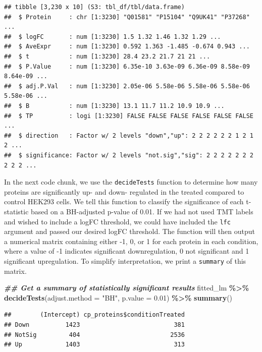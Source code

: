 \documentclass[9pt,a4paper,]{extarticle}
\newenvironment{Shaded}{\begin{snugshade}}{\end{snugshade}}
\newcommand{\AttributeTok}[1]{\textcolor[rgb]{0.13,0.29,0.53}{#1}}
\newcommand{\DocumentationTok}[1]{\textcolor[rgb]{0.56,0.35,0.01}{\textbf{\textit{#1}}}}
\newcommand{\FloatTok}[1]{\textcolor[rgb]{0.00,0.00,0.81}{#1}}
\newcommand{\FunctionTok}[1]{\textcolor[rgb]{0.13,0.29,0.53}{\textbf{#1}}}
\newcommand{\NormalTok}[1]{#1}
\newcommand{\SpecialCharTok}[1]{\textcolor[rgb]{0.81,0.36,0.00}{\textbf{#1}}}
\newcommand{\StringTok}[1]{\textcolor[rgb]{0.31,0.60,0.02}{#1}}
\begin{document}
\begin{verbatim}
## tibble [3,230 x 10] (S3: tbl_df/tbl/data.frame)
##  $ Protein     : chr [1:3230] "Q01581" "P15104" "Q9UK41" "P37268" ...
##  $ logFC       : num [1:3230] 1.5 1.32 1.46 1.32 1.29 ...
##  $ AveExpr     : num [1:3230] 0.592 1.363 -1.485 -0.674 0.943 ...
##  $ t           : num [1:3230] 28.4 23.2 21.7 21 21 ...
##  $ P.Value     : num [1:3230] 6.35e-10 3.63e-09 6.36e-09 8.58e-09 8.64e-09 ...
##  $ adj.P.Val   : num [1:3230] 2.05e-06 5.58e-06 5.58e-06 5.58e-06 5.58e-06 ...
##  $ B           : num [1:3230] 13.1 11.7 11.2 10.9 10.9 ...
##  $ TP          : logi [1:3230] FALSE FALSE FALSE FALSE FALSE FALSE ...
##  $ direction   : Factor w/ 2 levels "down","up": 2 2 2 2 2 2 1 2 1 2 ...
##  $ significance: Factor w/ 2 levels "not.sig","sig": 2 2 2 2 2 2 2 2 2 2 ...
\end{verbatim}

In the next code chunk, we use the \texttt{decideTests} function to determine how many
proteins are significantly up- and down- regulated in the treated compared to control
HEK293 cells. We tell this function to classify the significance of each
t-statistic based on a BH-adjusted p-value of 0.01. If we had not used TMT
labels and wished to include a logFC threshold, we could have included the \texttt{lfc} argument
and passed our desired logFC threshold. The function will then output a numerical
matrix containing either -1, 0, or 1 for each protein in each condition, where a
value of -1 indicates significant downregulation, 0 not significant and 1 significant
upregulation. To simplify interpretation, we print a \texttt{summary} of this matrix.

\begin{Shaded}
\begin{Highlighting}[]
\DocumentationTok{\#\# Get a summary of statistically significant results}
\NormalTok{fitted\_lm }\SpecialCharTok{\%\textgreater{}\%}
  \FunctionTok{decideTests}\NormalTok{(}\AttributeTok{adjust.method =} \StringTok{"BH"}\NormalTok{,}
              \AttributeTok{p.value =} \FloatTok{0.01}\NormalTok{) }\SpecialCharTok{\%\textgreater{}\%}
  \FunctionTok{summary}\NormalTok{()}
\end{Highlighting}
\end{Shaded}

\begin{verbatim}
##        (Intercept) cp_proteins$conditionTreated
## Down          1423                          381
## NotSig         404                         2536
## Up            1403                          313
\end{verbatim}
\end{document}
